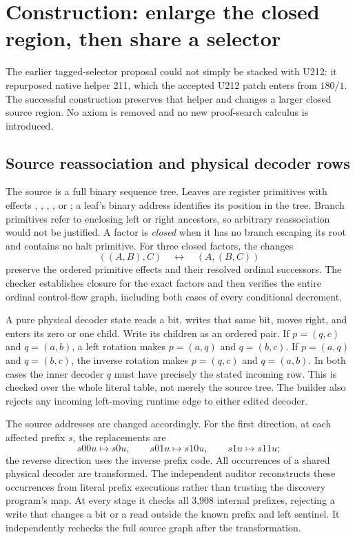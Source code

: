 \section{Construction: enlarge the closed region, then share a selector}
\label{sec:construction}

The earlier tagged-selector proposal could not simply be stacked with U212:
it repurposed native helper 211, which the accepted U212 patch enters from
$180/1$. The successful construction preserves that helper and changes a
larger closed source region. No axiom is removed and no new proof-search
calculus is introduced.

\subsection{Source reassociation and physical decoder rows}

The source is a full binary sequence tree. Leaves are register primitives
with effects , , , , or ; a leaf's
binary address identifies its position in the tree. Branch primitives
refer to enclosing left or right ancestors, so arbitrary reassociation
would not be justified. A factor is \emph{closed} when it has no branch
escaping its root and contains no halt primitive. For three closed factors,
the changes
\[
        ((A,B),C)\quad\longleftrightarrow\quad(A,(B,C))
\]
preserve the ordered primitive effects and their resolved ordinal successors.
The checker establishes closure for the exact factors and then verifies
the entire ordinal control-flow graph, including both cases of every
conditional decrement.

A pure physical decoder state reads a bit, writes that same bit, moves
right, and enters its zero or one child. Write its children as an ordered
pair. If $p=(q,c)$ and $q=(a,b)$, a left rotation makes
$p=(a,q)$ and $q=(b,c)$. If $p=(a,q)$ and $q=(b,c)$, the inverse rotation
makes $p=(q,c)$ and $q=(a,b)$. In both cases the inner decoder $q$ must
have precisely the stated incoming row. This is checked over the whole
literal table, not merely the source tree. The builder also rejects any
incoming left-moving runtime edge to either edited decoder.

The source addresses are changed accordingly. For the first direction,
at each affected prefix $s$, the replacements are
\[
       s00u\mapsto s0u,\qquad
       s01u\mapsto s10u,\qquad
       s1u\mapsto s11u;
\]
the reverse direction uses the inverse prefix code. All occurrences of a
shared physical decoder are transformed. The independent auditor reconstructs
these occurrences from literal prefix executions rather than trusting
the discovery program's map. At every stage it checks all 3,908 internal
prefixes, rejecting a write that changes a bit or a read outside the
known prefix and left sentinel. It independently rechecks the full source
graph after the transformation.

